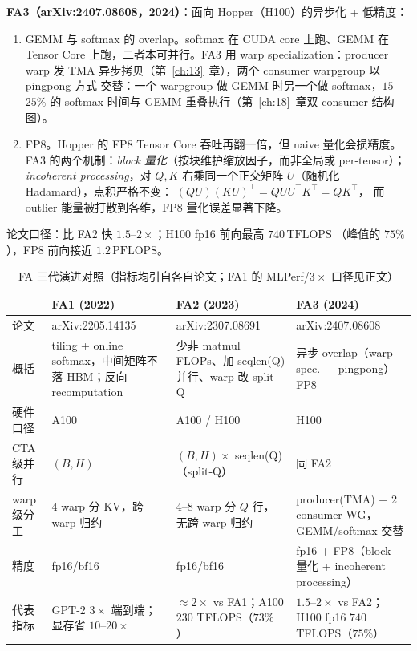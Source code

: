 \textbf{FA3（arXiv:2407.08608，2024）}：面向 Hopper（H100）的异步化 + 低精度：
\begin{enumerate}[itemsep=0pt,topsep=2pt]
  \item GEMM 与 softmax 的 overlap。softmax 在 CUDA core 上跑、GEMM 在 Tensor
        Core 上跑，二者本可并行。FA3 用 warp specialization：producer warp 发 TMA
        异步拷贝（第~\ref{ch:13}~章），两个 consumer warpgroup 以 pingpong 方式
        交替：一个 warpgroup 做 GEMM 时另一个做 softmax，$15$--$25\%$ 的 softmax
        时间与 GEMM 重叠执行（第~\ref{ch:18}~章双 consumer 结构图）。
  \item FP8。Hopper 的 FP8 Tensor Core 吞吐再翻一倍，但 naive 量化会损精度。
        FA3 的两个机制：\emph{block 量化}（按块维护缩放因子，而非全局或
        per-tensor）；\emph{incoherent processing}，对 $Q, K$ 右乘同一个正交矩阵
        $U$（随机化 Hadamard），点积严格不变：
        $(QU)(KU)^{\top} = QUU^{\top}K^{\top} = QK^{\top}$，
        而 outlier 能量被打散到各维，FP8 量化误差显著下降。
\end{enumerate}
论文口径：比 FA2 快 $1.5$--$2\times$；H100 fp16 前向最高 $740\,\mathrm{TFLOPS}$
（峰值的 $75\%$），FP8 前向接近 $1.2\,\mathrm{PFLOPS}$。

\begin{table}[htbp]
\centering
\caption{FA 三代演进对照（指标均引自各自论文；FA1 的 MLPerf/$3\times$ 口径见正文）}
\label{tab:15-fa-evo}
\small
\begin{tabular}{@{}p{1.5cm}p{4.1cm}p{4.6cm}p{4.9cm}@{}}
\toprule
 & FA1 (2022) & FA2 (2023) & FA3 (2024) \\
\midrule
论文 & arXiv:2205.14135 & arXiv:2307.08691 & arXiv:2407.08608 \\
概括 & tiling + online softmax，中间矩阵不落 HBM；反向 recomputation &
少非 matmul FLOPs、加 seqlen(Q) 并行、warp 改 split-Q &
异步 overlap（warp spec.\ + pingpong）+ FP8 \\
硬件口径 & A100 & A100 / H100 & H100 \\
CTA 级并行 & $(B, H)$ & $(B, H) \times$ seqlen(Q)（split-Q） & 同 FA2 \\
warp 级分工 & 4 warp 分 KV，跨 warp 归约 & 4--8 warp 分 $Q$ 行，无跨 warp 归约 &
producer(TMA) + 2 consumer WG，GEMM/softmax 交替 \\
精度 & fp16/bf16 & fp16/bf16 & fp16 + FP8（block 量化 + incoherent processing）\\
代表指标 & GPT-2 $3\times$ 端到端；显存省 $10$--$20\times$ &
$\approx 2\times$ vs FA1；A100 $230$ TFLOPS（$73\%$）&
$1.5$--$2\times$ vs FA2；H100 fp16 $740$ TFLOPS（$75\%$）\\
\bottomrule
\end{tabular}
\end{table}

